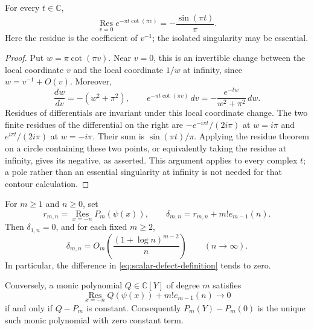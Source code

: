 \begin{lemma}
\label{lem:scalar-cotangent-residue}
For every $t\in\mathbb C$,
\begin{equation}
 \operatorname*{Res}_{v=0}e^{-\pi t\cot(\pi v)}
       =-\frac{\sin(\pi t)}{\pi}.
 \label{eq:scalar-cotangent-residue}
\end{equation}
Here the residue is the coefficient of $v^{-1}$; the isolated
singularity may be essential.
\end{lemma}

\begin{proof}
Put $w=\pi\cot(\pi v)$.  Near $v=0$, this is an invertible change
between the local coordinate $v$ and the local coordinate $1/w$ at
infinity, since $w=v^{-1}+O(v)$.  Moreover,
\begin{equation}
 \frac{dw}{dv}=-(w^2+\pi^2),\qquad
 e^{-\pi t\cot(\pi v)}\,dv
       =-\frac{e^{-tw}}{w^2+\pi^2}\,dw.
 \label{eq:scalar-residue-change-variable}
\end{equation}
Residues of differentials are invariant under this local coordinate
change.  The two finite residues of the differential on the right are
$-e^{-i\pi t}/(2i\pi)$ at $w=i\pi$ and
$e^{i\pi t}/(2i\pi)$ at $w=-i\pi$.  Their sum is
$\sin(\pi t)/\pi$.  Applying the residue theorem on a circle
containing these two points, or equivalently taking the residue at
infinity, gives its negative, as asserted.  This argument applies to
every complex $t$; a pole rather than an essential singularity at
infinity is not needed for that contour calculation.
\end{proof}

\begin{theorem}
\label{thm:scalar-gamma-normalization}
For $m\geq1$ and $n\geq0$, set
\begin{equation}
 r_{m,n}=\operatorname*{Res}_{x=-n}P_m(\psi(x)),
 \qquad
 \delta_{m,n}=r_{m,n}+m!e_{m-1}(n).
 \label{eq:scalar-defect-definition}
\end{equation}
Then $\delta_{1,n}=0$, and for each fixed $m\geq2$,
\begin{equation}
 \delta_{m,n}
   =O_m\!\left(\frac{(1+\log n)^{m-2}}{n}\right)
           \qquad(n\to\infty).
 \label{eq:scalar-defect-decay}
\end{equation}
In particular, the difference in
\eqref{eq:scalar-defect-definition} tends to zero.

Conversely, a monic polynomial $Q\in\mathbb C[Y]$ of degree $m$
satisfies
\begin{equation}
 \operatorname*{Res}_{x=-n}Q(\psi(x))+m!e_{m-1}(n)
           \longrightarrow0
 \label{eq:scalar-normalization-condition}
\end{equation}
if and only if $Q-P_m$ is constant.  Consequently
$P_m(Y)-P_m(0)$ is the unique such monic polynomial with zero
constant term.
\end{theorem}

